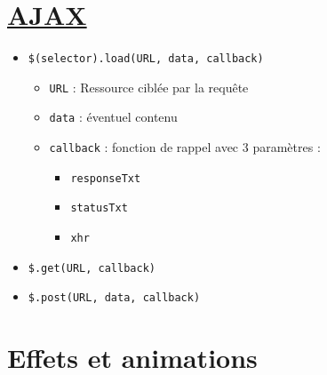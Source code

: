 \begin{english}

\begin{Shaded}
\begin{Highlighting}[]
\FunctionTok{$}\NormalTok{(}\NormalTok{)}\NormalTok{(}\NormalTok{()\{}
\NormalTok{\})}\OperatorTok{;} 
\end{Highlighting}
\end{Shaded}

\end{english}

\hypertarget{ajax11}{%
\section{\texorpdfstring{\href{https://www.w3schools.com/jquery/jquery_ajax_load.asp}{AJAX}}{AJAX}}\label{ajax11}}

\begin{itemize}
\tightlist
\item
  \textenglish{\texttt{\$(selector).load(URL,\ data,\ callback)}}

  \begin{itemize}
  \tightlist
  \item
    \textenglish{\texttt{URL}} : Ressource ciblée par la requête
  \item
    \textenglish{\texttt{data}} : éventuel contenu
  \item
    \textenglish{\texttt{callback}} : fonction de rappel avec 3
    paramètres :

    \begin{itemize}
    \tightlist
    \item
      \textenglish{\texttt{responseTxt}}
    \item
      \textenglish{\texttt{statusTxt}}
    \item
      \textenglish{\texttt{xhr}}
    \end{itemize}
  \end{itemize}
\item
  \textenglish{\texttt{\$.get(URL,\ callback)}}
\item
  \textenglish{\texttt{\$.post(URL,\ data,\ callback)}}
\end{itemize}

\hypertarget{effets-et-animations}{%
\section{Effets et animations}\label{effets-et-animations}}

